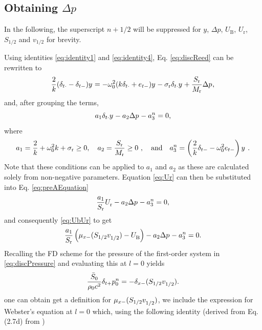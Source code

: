 \subsection{Obtaining $\Delta p$}\label{sec:obtainingDeltaP}
In the following, the superscript $n+1/2$ will be suppressed for $y$, $\Delta p$, $U_\text{B}$, $U_\text{r}$, $S_{1/2}$ and $v_{1/2}$ for brevity. 

Using identities \eqref{eq:identity1} and \eqref{eq:identity4}, Eq. \eqref{eq:discReed} can be rewritten to
\begin{equation*}
    \frac{2}{k} (\delta_{t\cdot} - \delta_{t-})y^{} = -\omega_0^2(k\delta_{t\cdot} + e_{t-})y^{} - \sigma_\text{r}\delta_{t\cdot} y^{} + \frac{S_\text{r}}{M_\text{r}}\Delta p^{},
\end{equation*}
and, after grouping the terms,
\begin{equation}
    a_1\delta_{t\cdot}y^{} - a_2\Delta p^{} - a_3^n = 0,\label{eq:preAEquation}
\end{equation}
where
\begin{equation}\label{eq:aCoeffs}
    a_1 = \frac{2}{k} + \omega_0^2k + \sigma_\text{r} \geq 0, \quad a_2 = \frac{S_\text{r}}{M_\text{r}} \geq 0\ , \quad \text{and} \quad a_3^n = \left(\frac{2}{k} \delta_{t-} - \omega_0^2e_{t-}\right)y^{\nph}\ .
\end{equation}
Note that these conditions can be applied to $a_1$ and $a_2$ as these are calculated solely from non-negative parameters. %
Equation \eqref{eq:Ur} can then be substituted into Eq. \eqref{eq:preAEquation}
\begin{equation*}
    \frac{a_1}{S_\text{r}}U_\text{r}^{} - a_2 \Delta p^{} - a_3^n = 0,
\end{equation*}
and consequently \eqref{eq:UbUr} to get
\begin{equation}\label{eq:aEquation}
    \frac{a_1}{S_\text{r}}\left(\mu_{x-}(S_{1/2}v_{1/2}^{}) - U_\text{B}^{}\right) - a_2 \Delta p^{} - a_3^n = 0.
\end{equation}
%
Recalling the FD scheme for the pressure of the first-order system in \eqref{eq:discPressure} and evaluating this at $l = 0$ yields
\begin{equation}
    \frac{\bar S_0}{\rho_0 c^2}\delta_{t+}p_0^n = -\delta_{x-}(S_{1/2}v_{1/2}^{}).
\end{equation}
one can obtain get a definition for $\mu_{x-}(S_{1/2}v_{1/2}^{})$, we include the expression for Webster's equation at $l=0$ which, using the following identity (derived from Eq. (2.7d) from \cite{theBible})
